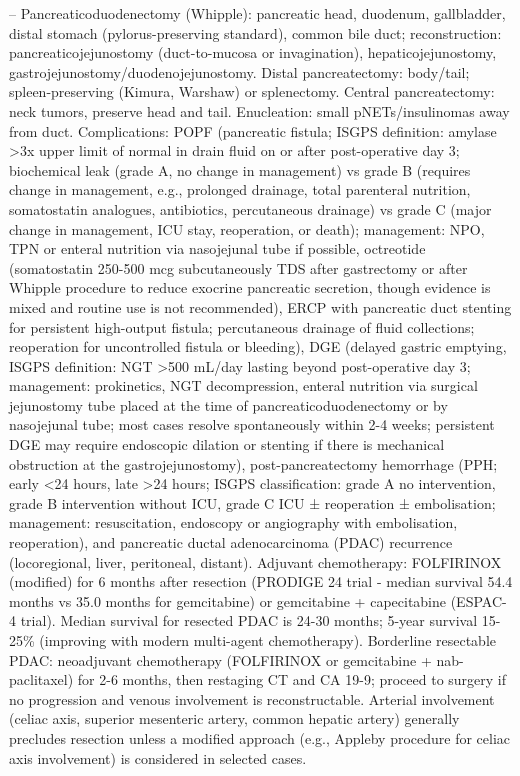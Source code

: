 -- Pancreaticoduodenectomy (Whipple): pancreatic head, duodenum, gallbladder, distal stomach (pylorus-preserving standard), common bile duct; reconstruction: pancreaticojejunostomy (duct-to-mucosa or invagination), hepaticojejunostomy, gastrojejunostomy/duodenojejunostomy. Distal pancreatectomy: body/tail; spleen-preserving (Kimura, Warshaw) or splenectomy. Central pancreatectomy: neck tumors, preserve head and tail. Enucleation: small pNETs/insulinomas away from duct. Complications: POPF (pancreatic fistula; ISGPS definition: amylase >3x upper limit of normal in drain fluid on or after post-operative day 3; biochemical leak (grade A, no change in management) vs grade B (requires change in management, e.g., prolonged drainage, total parenteral nutrition, somatostatin analogues, antibiotics, percutaneous drainage) vs grade C (major change in management, ICU stay, reoperation, or death); management: NPO, TPN or enteral nutrition via nasojejunal tube if possible, octreotide (somatostatin 250-500 mcg subcutaneously TDS after gastrectomy or after Whipple procedure to reduce exocrine pancreatic secretion, though evidence is mixed and routine use is not recommended), ERCP with pancreatic duct stenting for persistent high-output fistula; percutaneous drainage of fluid collections; reoperation for uncontrolled fistula or bleeding), DGE (delayed gastric emptying, ISGPS definition: NGT >500 mL/day lasting beyond post-operative day 3; management: prokinetics, NGT decompression, enteral nutrition via surgical jejunostomy tube placed at the time of pancreaticoduodenectomy or by nasojejunal tube; most cases resolve spontaneously within 2-4 weeks; persistent DGE may require endoscopic dilation or stenting if there is mechanical obstruction at the gastrojejunostomy), post-pancreatectomy hemorrhage (PPH; early <24 hours, late >24 hours; ISGPS classification: grade A no intervention, grade B intervention without ICU, grade C ICU ± reoperation ± embolisation; management: resuscitation, endoscopy or angiography with embolisation, reoperation), and pancreatic ductal adenocarcinoma (PDAC) recurrence (locoregional, liver, peritoneal, distant). Adjuvant chemotherapy: FOLFIRINOX (modified) for 6 months after resection (PRODIGE 24 trial - median survival 54.4 months vs 35.0 months for gemcitabine) or gemcitabine + capecitabine (ESPAC-4 trial). Median survival for resected PDAC is 24-30 months; 5-year survival 15-25\% (improving with modern multi-agent chemotherapy). Borderline resectable PDAC: neoadjuvant chemotherapy (FOLFIRINOX or gemcitabine + nab-paclitaxel) for 2-6 months, then restaging CT and CA 19-9; proceed to surgery if no progression and venous involvement is reconstructable. Arterial involvement (celiac axis, superior mesenteric artery, common hepatic artery) generally precludes resection unless a modified approach (e.g., Appleby procedure for celiac axis involvement) is considered in selected cases.

